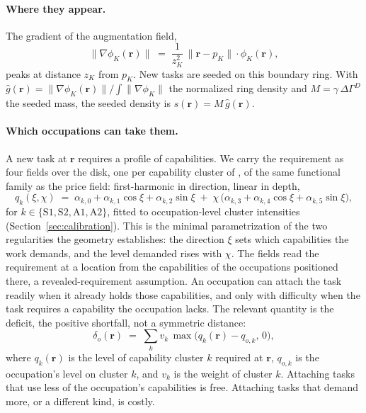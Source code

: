 \documentclass[12pt, a4paper]{article}
\begin{document}
\paragraph{Where they appear.}
The gradient of the augmentation field,
\begin{equation}
  \|\nabla \phi_K(\mathbf{r})\|
  \;=\;
  \frac{1}{z_K^2}\,\|\mathbf{r} - p_K\| \cdot \phi_K(\mathbf{r}),
  \label{eq:gradient-phi}
\end{equation}
peaks at distance $z_K$ from $p_K$. New tasks are seeded on this
boundary ring. With $\hat{g}(\mathbf{r}) = \|\nabla\phi_K(\mathbf{r})\|
/ \int \|\nabla\phi_K\|$ the normalized ring density and $M = \gamma\,
\Delta\Gamma^D$ the seeded mass, the seeded density is
$s(\mathbf{r}) = M\,\hat{g}(\mathbf{r})$.

\paragraph{Which occupations can take them.}
A new task at $\mathbf{r}$ requires a profile of capabilities. We carry
the requirement as four fields over the disk, one per capability
cluster of \textcite{storck2026geometry}, of the same functional family
as the price field: first-harmonic in direction, linear in depth,
\begin{equation}
  q_k(\xi, \chi)
  \;=\;
  \alpha_{k,0} + \alpha_{k,1}\cos\xi + \alpha_{k,2}\sin\xi
  \;+\; \chi\,\bigl(\alpha_{k,3} + \alpha_{k,4}\cos\xi
  + \alpha_{k,5}\sin\xi\bigr),
  \label{eq:capability-field}
\end{equation}
for $k \in \{\mathrm{S1}, \mathrm{S2}, \mathrm{A1}, \mathrm{A2}\}$,
fitted to occupation-level cluster intensities
(Section~\ref{sec:calibration}). This is the minimal parametrization of
the two regularities the geometry establishes: the direction $\xi$ sets
which capabilities the work demands, and the level demanded rises with
$\chi$. The fields read the requirement at a location from the
capabilities of the occupations positioned there, a
revealed-requirement assumption. An occupation
can attach the task readily when it already holds those capabilities,
and only with difficulty when the task requires a capability the
occupation lacks. The relevant quantity is the deficit, the positive
shortfall, not a symmetric distance:
\begin{equation}
  \delta_o(\mathbf{r})
  \;=\;
  \sum_k v_k \,\max\!\bigl(q_k(\mathbf{r}) - q_{o,k},\, 0\bigr),
  \label{eq:deficit}
\end{equation}
where $q_k(\mathbf{r})$ is the level of capability cluster $k$ required
at $\mathbf{r}$, $q_{o,k}$ is the occupation's level on cluster $k$, and
$v_k$ is the weight of cluster $k$. Attaching tasks that use less of the
occupation's capabilities is free. Attaching tasks that demand more, or
a different kind, is costly.
\end{document}
